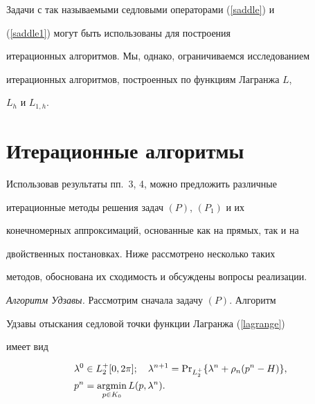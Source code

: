 Задачи с так называемыми седловыми операторами (\ref{saddle}) и


(\ref{saddle1}) могут быть использованы для построения


итерационных алгоритмов. Мы, однако, ограничиваемся исследованием


итерационных алгоритмов, построенных по функциям Лагранжа $L$,


$L_h$ и $L_{1,h}$.








\section{Итерационные алгоритмы}





Использовав результаты пп.~3, 4, можно предложить различные


итерационные методы решения задач $(P)$, $(P_1)$ и их


конечномерных аппроксимаций, основанные как на прямых, так и на


двойственных постановках. Ниже рассмотрено несколько таких


методов, обоснована их сходимость и обсуждены вопросы реализации.


\medskip





{\it Алгоритм Удзавы.} Рассмотрим сначала задачу $(P)$. Алгоритм


Удзавы отыскания седловой точки функции Лагранжа (\ref{lagrange})


имеет вид


\begin{equation}\label {udzava}


\begin{split}


&\lambda^{0} \in L_{2}^{+}[0,2\pi];


\quad \lambda^{n+1}= \PR_{L_{2}^{+}}


\{\lambda^{n}+\rho_{n}(p^{n}-H)\},\\


&p^{n}= \argmin\limits_{p\in K_{0}} L(p,\lambda^{n}).


\end{split}


\end{equation}


